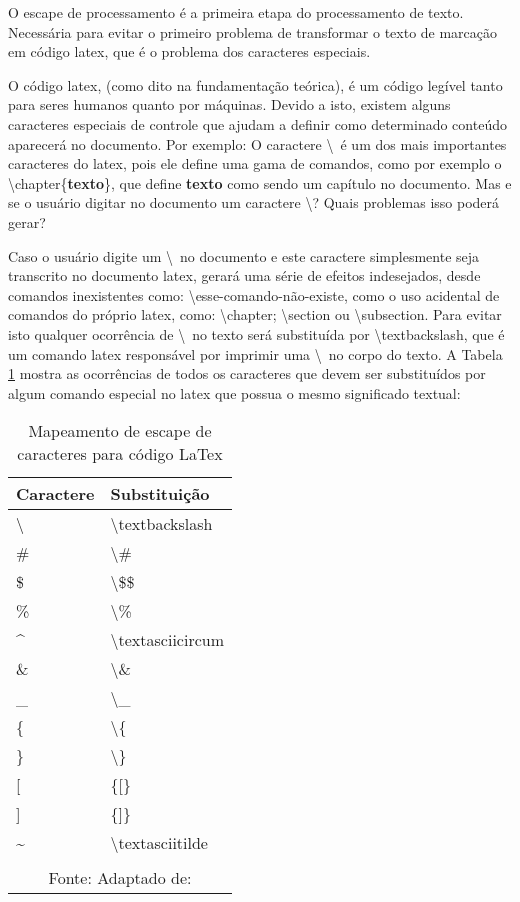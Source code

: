 O escape de processamento é a primeira etapa do processamento
de texto. Necessária para evitar o primeiro problema de transformar
o texto de marcação em código
\acrshort{latex},
que é o problema dos caracteres especiais.

O código
\acrshort{latex},
(como dito na fundamentação teórica),
é um código legível tanto para seres humanos
quanto por máquinas. Devido a isto, existem alguns caracteres
especiais de controle que ajudam a definir como
determinado conteúdo aparecerá no documento. Por exemplo:
O caractere \textbackslash~é  um dos mais importantes caracteres do
\acrshort{latex},
pois ele
define uma gama de comandos, como por exemplo o \textbackslash chapter\{\textbf{texto}\},
que define
\textbf{texto}
como sendo um capítulo no documento.
Mas e se o usuário digitar no documento um caractere \textbackslash ?
Quais problemas isso poderá gerar?

Caso o usuário digite um \textbackslash~no documento e este caractere simplesmente seja
transcrito no documento
\acrshort{latex},
gerará uma série de efeitos indesejados, desde
comandos inexistentes como: \textbackslash esse-comando-não-existe,
como o uso acidental de comandos do próprio
\acrshort{latex},
como:
\textbackslash chapter; \textbackslash section ou \textbackslash subsection.
Para evitar isto qualquer ocorrência de
\textbackslash~no texto será substituída por \textbackslash textbackslash, que é um comando
\acrshort{latex}
responsável por imprimir uma \textbackslash~no corpo
do texto.
A
Tabela \ref{tbl:escape-characters}
mostra as ocorrências de todos os caracteres que devem ser substituídos
por algum comando especial no
\acrshort{latex}
que possua o mesmo significado textual:

\begin{table}[H]
    \centering
    \caption{Mapeamento de escape de caracteres para código LaTex}
    \label{tbl:escape-characters}
    \renewcommand{\arraystretch}{1.5}
    \begin{tabular}{p{2.5600cm} p{3.8400cm}}
        \hline
        \textbf{Caractere} & \textbf{Substituição} \\
        \hline
        \textbackslash  & \textbackslash textbackslash  \\
		\# & \textbackslash \# \\
		\$ & \textbackslash \$\$ \\
		\% & \textbackslash \% \\
		\textasciicircum  & \textbackslash textasciicircum  \\
		\& & \textbackslash \& \\
		\_ & \textbackslash \_ \\
		\{ & \textbackslash \{ \\
		\} & \textbackslash \} \\
		{[} & \{{[}\} \\
		{]} & \{{]}\} \\
		\textasciitilde  & \textbackslash textasciitilde  \\
        \hline
        \\\multicolumn{2}{c}{\fontsize{10pt}{12pt}Fonte: Adaptado de: \cite{tutorial-latex}}
    \end{tabular}
\end{table}

